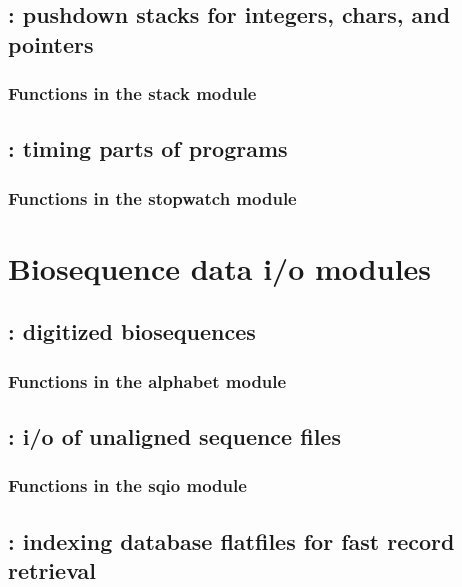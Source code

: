 \documentclass[10pt]{book}
\begin{document}
\newpage
\section{: pushdown stacks for integers, chars, and pointers}

\subsection{Functions in the stack module}


\newpage
\section{: timing parts of programs}

\subsection{Functions in the stopwatch module}



\chapter{Biosequence data i/o modules}

\newpage
\section{: digitized biosequences}

\subsection{Functions in the alphabet module}


\newpage
\section{: i/o of unaligned sequence files}

\subsection{Functions in the sqio module}


\newpage
\section{: indexing database flatfiles for fast record retrieval}

\end{document}
